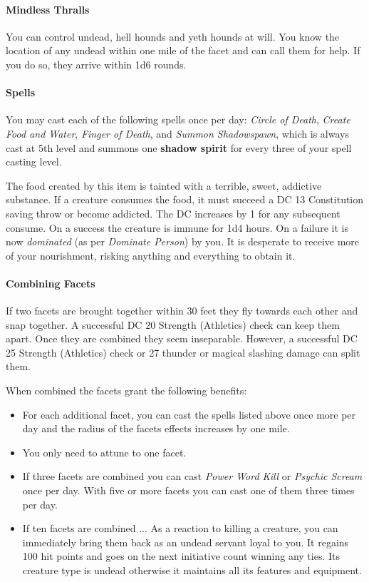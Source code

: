 \documentclass[letter,10pt,twocolumn,openany]{dndbook}
\begin{document}
\paragraph{Mindless Thralls}
You can control undead, hell hounds and yeth hounds at will.
You know the location of any undead within one mile of the facet and can call them for help.
If you do so, they arrive within 1d6 rounds.

\paragraph{Spells}
You may cast each of the following spells once per day:
\textit{Circle of Death}, \textit{Create Food and Water}, \textit{Finger of Death}, and \textit{Summon Shadowspawn},
which is always cast at 5th level and summons one \textbf{shadow spirit} for every three of your spell casting level.

The food created by this item is tainted with a terrible, sweet, addictive substance.
If a creature consumes the food, it must succeed a DC 13 Constitution saving throw or become addicted.
The DC increases by 1 for any subsequent consume.
On a success the creature is immune for 1d4 hours.
On a failure it is now \textit{dominated} (as per \textit{Dominate Person}) by you.
It is desperate to receive more of your nourishment, risking anything and everything to obtain it.

\paragraph{Combining Facets}
If two facets are brought together within 30 feet they fly towards each other and snap together.
A successful DC 20 Strength (Athletics) check can keep them apart.
Once they are combined they seem inseparable.
However, a successful DC 25 Strength (Athletics) check or 27 thunder or magical slashing damage can split them.

When combined the facets grant the following benefits:
\begin{itemize}
    \item For each additional facet, you can cast the spells listed above once more per day and the radius of the facets effects increases by one mile.
    \item You only need to attune to one facet.
    \item If three facets are combined you can cast \textit{Power Word Kill} or \textit{Psychic Scream} once per day.
          With five or more facets you can cast one of them three times per day.
    \item If ten facets are combined ...
          As a reaction to killing a creature, you can immediately bring them back as an undead servant loyal to you.
          It regains 100 hit points and goes on the next initiative count winning any ties.
          Its creature type is undead otherwise it maintains all its features and equipment.
\end{itemize}
\end{document}
